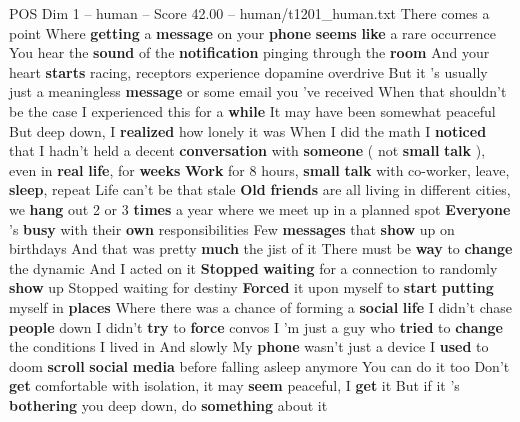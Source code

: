 \begin{textsample}{POS Dim 1 – human – Score 42.00 – human/t1201\_human.txt}  \label{ex:f1_pos_040}
There comes a point Where \textbf{getting} a \textbf{message} on your \textbf{phone} \textbf{seems} \textbf{like} a rare occurrence You hear the \textbf{sound} of the \textbf{notification} pinging through the \textbf{room} And your heart \textbf{starts} racing, receptors experience dopamine overdrive But it 's usually just a meaningless \textbf{message} or some email you 've received When that shouldn't be the case I experienced this for a \textbf{while} It may have been somewhat peaceful But deep down, I \textbf{realized} how lonely it was When I did the math I \textbf{noticed} that I hadn't held a decent \textbf{conversation} with \textbf{someone} ( not \textbf{small} \textbf{talk} ), even in \textbf{real} \textbf{life}, for \textbf{weeks} \textbf{Work} for 8 hours, \textbf{small} \textbf{talk} with co-worker, leave, \textbf{sleep}, repeat Life can't be that stale \textbf{Old} \textbf{friends} are all living in different cities, we \textbf{hang} out 2 or 3 \textbf{times} a year where we meet up in a planned spot \textbf{Everyone} 's \textbf{busy} with their \textbf{own} responsibilities Few \textbf{messages} that \textbf{show} up on birthdays And that was pretty \textbf{much} the jist of it There must be \textbf{way} to \textbf{change} the dynamic And I acted on it \textbf{Stopped} \textbf{waiting} for a connection to randomly \textbf{show} up Stopped waiting for destiny \textbf{Forced} it upon myself to \textbf{start} \textbf{putting} myself in \textbf{places} Where there was a chance of forming a \textbf{social} \textbf{life} I didn't chase \textbf{people} down I didn't \textbf{try} to \textbf{force} convos I 'm just a guy who \textbf{tried} to \textbf{change} the conditions I lived in And slowly My \textbf{phone} wasn't just a device I \textbf{used} to doom \textbf{scroll} \textbf{social} \textbf{media} before falling asleep anymore You can do it too Don't \textbf{get} comfortable with isolation, it may \textbf{seem} peaceful, I \textbf{get} it But if it 's \textbf{bothering} you deep down, do \textbf{something} about it

\end{textsample}
